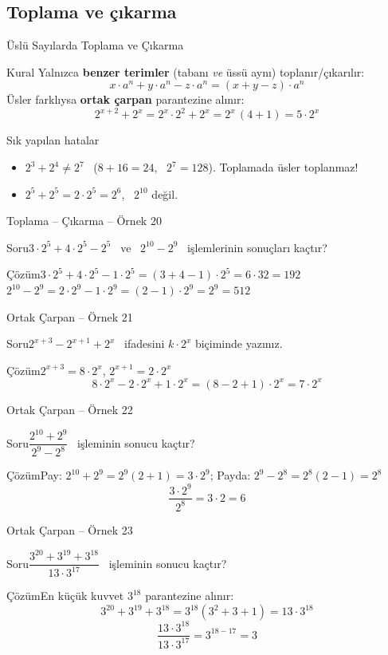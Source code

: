 \documentclass[aspectratio=169,11pt]{beamer}
\newcommand{\soru}[3]{%
\begin{frame}{#1}
  \begin{block}{Soru}\large #2\end{block}
  \pause
  \begin{exampleblock}{Çözüm}\large #3\end{exampleblock}
\end{frame}}
\begin{document}
\subsection{Toplama ve çıkarma}
\begin{frame}{Üslü Sayılarda Toplama ve Çıkarma}
\begin{block}{Kural}
Yalnızca \textbf{benzer terimler} (tabanı \emph{ve} üssü aynı) toplanır/çıkarılır:
\[x\cdot a^n+y\cdot a^n-z\cdot a^n=(x+y-z)\cdot a^n\]
Üsler farklıysa \textbf{ortak çarpan} parantezine alınır:
\[2^{x+2}+2^{x}=2^x\cdot 2^2+2^x=2^x\,(4+1)=5\cdot 2^x\]
\end{block}
\begin{alertblock}{Sık yapılan hatalar}
\begin{itemize}
\item \(2^3+2^4\neq 2^7\) \ (\(8+16=24\), \ \(2^7=128\)). Toplamada üsler toplanmaz!
\item \(2^5+2^5=2\cdot 2^5=2^6\), \ \(2^{10}\) değil.
\end{itemize}
\end{alertblock}
\end{frame}

\soru{Toplama -- Çıkarma -- Örnek 20}
{\(3\cdot 2^5+4\cdot 2^5-2^5\) \ ve \ \(2^{10}-2^{9}\) \ işlemlerinin sonuçları kaçtır?}
{\(3\cdot 2^5+4\cdot 2^5-1\cdot 2^5=(3+4-1)\cdot 2^5=6\cdot 32=192\)\\[4pt]
\(2^{10}-2^{9}=2\cdot 2^{9}-1\cdot 2^{9}=(2-1)\cdot 2^{9}=2^{9}=512\)}

\soru{Ortak Çarpan -- Örnek 21}
{\(2^{x+3}-2^{x+1}+2^{x}\) \ ifadesini \(k\cdot 2^x\) biçiminde yazınız.}
{\(2^{x+3}=8\cdot 2^x\), \quad \(2^{x+1}=2\cdot 2^x\)
\[8\cdot 2^x-2\cdot 2^x+1\cdot 2^x=(8-2+1)\cdot 2^x=7\cdot 2^x\]}

\soru{Ortak Çarpan -- Örnek 22}
{\(\dfrac{2^{10}+2^{9}}{2^{9}-2^{8}}\) \ işleminin sonucu kaçtır?}
{Pay: \(2^{10}+2^{9}=2^{9}(2+1)=3\cdot 2^{9}\); \quad Payda: \(2^{9}-2^{8}=2^{8}(2-1)=2^{8}\)
\[\frac{3\cdot 2^{9}}{2^{8}}=3\cdot 2=6\]}

\soru{Ortak Çarpan -- Örnek 23}
{\(\dfrac{3^{20}+3^{19}+3^{18}}{13\cdot 3^{17}}\) \ işleminin sonucu kaçtır?}
{En küçük kuvvet \(3^{18}\) parantezine alınır:
\[3^{20}+3^{19}+3^{18}=3^{18}(3^2+3+1)=13\cdot 3^{18}\]
\[\frac{13\cdot 3^{18}}{13\cdot 3^{17}}=3^{18-17}=3\]}
\end{document}
